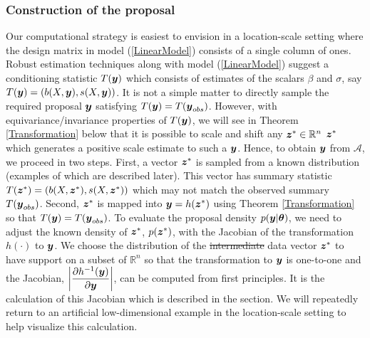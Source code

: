 \documentclass[12pt]{article}
\def\bth{\mbox{\boldmath $\theta$}}
\newcommand{\by}{\mbox{\boldmath $y$}}
\newcommand{\bz}{\mbox{\boldmath $z$}}
\newcommand{\green}[1]{{\color{green}#1}}
\begin{document}
\subsubsection{Construction of the proposal}
Our \green{computational} strategy is easiest to envision in a location-scale setting where 
the design matrix in model (\ref{LinearModel}) consists of a single column of ones.  Robust estimation techniques along
with model (\ref{LinearModel}) suggest a conditioning statistic $T(\by)$ which consists of
estimates of the scalars $\beta$ and $\sigma$, say $T(\by)=(b(X,\by),
s(X,\by))$.  It is not a simple matter to directly sample the required
proposal $\by$ satisfying $T(\by)=T(\by_{obs})$. However, 
  with equivariance/invariance properties of $T(\by)$, we will see in Theorem \ref{Transformation} below
    that it is possible to scale and shift any \sout{$\bz^{*}\in \mathbb R^{n}$} \green{$\bz^{*}$ which generates 
a positive scale estimate} to such a
    $\by$. Hence, to obtain $\by$ from $\mathcal A$, we proceed
  in two steps. First, a vector $\bz^*$ is sampled from a known
  distribution (examples of which are described later). This vector has summary statistic   
$T(\bz^*) = (b(X,\bz^*), s(X,\bz^*))$ which may not match the observed summary
$T(\by_{obs})$.  Second, $\bz^*$ is mapped into $\by =h(\bz^*)$
using Theorem \ref{Transformation} so that $T(\by)=T(\by_{obs})$. To
evaluate the proposal density $p(\by|\bth)$, we need to adjust
the known density of $\bz^*$, $p(\bz^*)$, with the Jacobian of
the transformation $h(\cdot)$ to $\by$. We choose the
distribution of the \green{\sout{intermediate}} data vector $\bz^*$ to have support
\green{on a subset of $\mathbb R^n$ so that}
the transformation to $\by$ is one-to-one and the Jacobian,
$\displaystyle \left|\frac{\partial h^{-1}(\by)}{\partial \by}\right|$, can be computed from first principles. It is the calculation of this Jacobian which is described in the section. We will repeatedly return to an artificial low-dimensional example in the location-scale setting to help visualize this calculation.  

\end{document}
